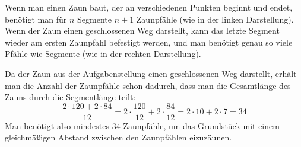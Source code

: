 \begin{exercise}
\begin{center}
    \end{center}
    Wenn man einen Zaun baut, der an verschiedenen
    Punkten beginnt und endet, benötigt man für
    $n$ Segmente $n+1$ Zaunpfähle (wie in der
    linken Darstellung).
    Wenn der Zaun einen geschlossenen Weg darstellt,
    kann das letzte Segment wieder am ersten
    Zaunpfahl befestigt werden, und man benötigt
    genau so viele Pfähle wie Segmente (wie in der
    rechten Darstellung).\par
    Da der Zaun aus der Aufgabenstellung einen
    geschlossenen Weg darstellt, erhält man die
    Anzahl der Zaunpfähle schon dadurch, dass man
    die Gesamtlänge des Zauns durch die Segmentlänge
    teilt:
    \begin{equation*}
      \frac{2\cdot120+2\cdot84}{12}
      =2\cdot\frac{120}{12}+2\cdot\frac{84}{12}
      =2\cdot10+2\cdot7
      =34
    \end{equation*}
    Man benötigt also mindestes 34 Zaunpfähle, um
    das Grundstück mit einem gleichmäßigen Abstand
    zwischen den Zaunpfählen eizuzäunen.
  \fi
\end{exercise}
